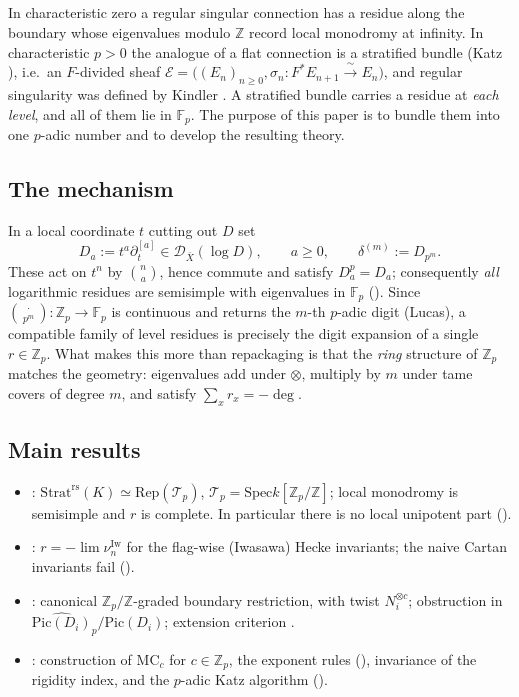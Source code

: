 \documentclass[11pt,reqno]{amsart}
\newcommand{\Zp}{\mathbb{Z}_p}
\newcommand{\Fp}{\mathbb{F}_p}
\newcommand{\ZZ}{\mathbb{Z}}
\newcommand{\cD}{\mathcal{D}}
\newcommand{\cE}{\mathcal{E}}
\newcommand{\cT}{\mathcal{T}}
\newcommand{\Strat}{\mathrm{Strat}}
\newcommand{\rs}{\mathrm{rs}}
\newcommand{\Pic}{\mathrm{Pic}}
\newcommand{\Rep}{\mathrm{Rep}}
\newcommand{\Spec}{\mathrm{Spec}}
\newcommand{\Iw}{\mathrm{Iw}}
\newcommand{\MC}{\mathrm{MC}}
\newcommand{\isoto}{\xrightarrow{\ \sim\ }}
\theoremstyle{plain}
\theoremstyle{definition}
\theoremstyle{remark}
\numberwithin{equation}{section}
\begin{document}
\subsection{}
In characteristic zero a regular singular connection has a residue along
the boundary whose eigenvalues modulo $\ZZ$ record local monodromy at
infinity.  In characteristic $p>0$ the analogue of a flat connection is a
stratified bundle (Katz \cite{Katz}), i.e.\ an $F$-divided sheaf
$\cE=\bigl((E_n)_{n\ge0},\sigma_n\colon F^*E_{n+1}\isoto E_n\bigr)$, and
regular singularity was defined by Kindler \cite{Kindler}.  A stratified
bundle carries a residue at \emph{each level}, and all of them lie in
$\Fp$.  The purpose of this paper is to bundle them into one $p$-adic
number and to develop the resulting theory.

\subsection{The mechanism}
In a local coordinate $t$ cutting out $D$ set
\[
   D_a:=t^{a}\partial_t^{[a]}\in\cD_{\bar X}(\log D),\qquad a\ge0,
   \qquad \delta^{(m)}:=D_{p^m}.
\]
These act on $t^n$ by $\binom na$, hence commute and satisfy $D_a^p=D_a$;
consequently \emph{all} logarithmic residues are semisimple with
eigenvalues in $\Fp$ ().  Since
$\binom{\cdot}{p^m}\colon\Zp\to\Fp$ is continuous and returns the $m$-th
$p$-adic digit (Lucas), a compatible family of level residues is precisely
the digit expansion of a single $r\in\Zp$.  What makes this more than
repackaging is that the \emph{ring} structure of $\Zp$ matches the
geometry: eigenvalues add under $\otimes$, multiply by $m$ under tame
covers of degree $m$, and satisfy $\sum_x r_x=-\deg$.

\subsection{Main results}
\begin{itemize}
\item {}: $\Strat^{\rs}(K)\simeq\Rep(\cT_p)$,
      $\cT_p=\Spec k[\Zp/\ZZ]$; local monodromy is semisimple and $r$ is
      complete.  In particular there is no local unipotent part
      ().
\item {}: $r=-\lim\nu_n^{\Iw}$ for the flag-wise
      (Iwasawa) Hecke invariants; the naive Cartan invariants fail
      ().
\item {}: canonical $\Zp/\ZZ$-graded boundary
      restriction, with twist $N_i^{\otimes c}$; obstruction in
      $\widehat{\Pic(D_i)}_p/\Pic(D_i)$; extension criterion
      .
\item {}: construction of $\MC_c$ for $c\in\Zp$, the exponent
      rules (), invariance of the rigidity index, and
      the $p$-adic Katz algorithm ().
\end{itemize}
\end{document}
